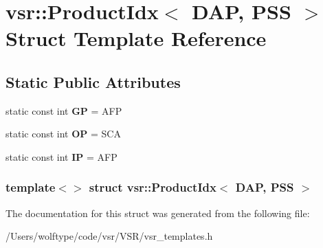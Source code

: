 \hypertarget{structvsr_1_1_product_idx_3_01_d_a_p_00_01_p_s_s_01_4}{\section{vsr\-:\-:Product\-Idx$<$ D\-A\-P, P\-S\-S $>$ Struct Template Reference}
\label{structvsr_1_1_product_idx_3_01_d_a_p_00_01_p_s_s_01_4}
}
\subsection*{Static Public Attributes}
\begin{DoxyCompactItemize}
\item 
\hypertarget{structvsr_1_1_product_idx_3_01_d_a_p_00_01_p_s_s_01_4_aad76574be64a3f771dd3e33519328d37}{static const int {\bfseries G\-P} = A\-F\-P}\label{structvsr_1_1_product_idx_3_01_d_a_p_00_01_p_s_s_01_4_aad76574be64a3f771dd3e33519328d37}

\item 
\hypertarget{structvsr_1_1_product_idx_3_01_d_a_p_00_01_p_s_s_01_4_a3e293597656475f353048bc47d8caefc}{static const int {\bfseries O\-P} = S\-C\-A}\label{structvsr_1_1_product_idx_3_01_d_a_p_00_01_p_s_s_01_4_a3e293597656475f353048bc47d8caefc}

\item 
\hypertarget{structvsr_1_1_product_idx_3_01_d_a_p_00_01_p_s_s_01_4_a3e6f01daf2354b75e6307bbee40c54f7}{static const int {\bfseries I\-P} = A\-F\-P}\label{structvsr_1_1_product_idx_3_01_d_a_p_00_01_p_s_s_01_4_a3e6f01daf2354b75e6307bbee40c54f7}

\end{DoxyCompactItemize}
\subsubsection*{template$<$$>$ struct vsr\-::\-Product\-Idx$<$ D\-A\-P, P\-S\-S $>$}



The documentation for this struct was generated from the following file\-:\begin{DoxyCompactItemize}
\item 
/\-Users/wolftype/code/vsr/\-V\-S\-R/vsr\-\_\-templates.\-h\end{DoxyCompactItemize}
